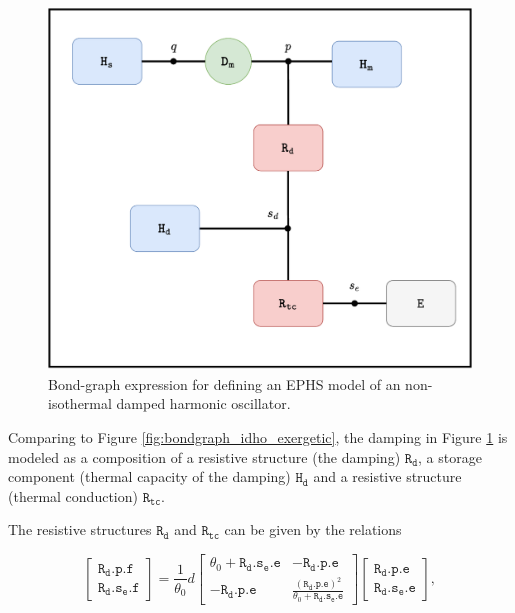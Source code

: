 \documentclass[
	parskip, 			   %
	twoside, 			   %
	DIV=14, 			   %
	BCOR=15.0mm, 		   %
	headsepline, 		   %
	open=right, 		   %
	captions=tableheading, %
	bibliography=totoc,    %
	numbers=noenddot       %
]{scrreprt}
\begin{document}
\begin{figure}[h!]
    \centering
    \includegraphics[scale=0.6]{figures/bondgraph_ndho_exergetic.pdf}
    \caption{Bond-graph expression for defining an EPHS model of an non-isothermal damped harmonic oscillator.}
    \label{fig:bondgraph_ndho_exergetic}
\end{figure}

Comparing to Figure \ref{fig:bondgraph_idho_exergetic}, the damping in Figure \ref{fig:bondgraph_ndho_exergetic} is modeled as a composition of a resistive structure (the damping) $\mathtt{R_d}$, a storage component (thermal capacity of the damping) $\mathtt{H_d}$ and a resistive structure (thermal conduction) $\mathtt{R_{tc}}$. 

The resistive structures $\mathtt{R_d}$ and $\mathtt{R_{tc}}$ can be given by the relations

\begin{equation}
    \label{eq:resistive_structure_damping_interconnection_ndho}
    \left[\begin{array}{l}\mathtt{R_{d}.p.f} \\ \mathtt{R_{d}.s_{e}.f}\end{array}\right]=\frac{1}{\theta_0} d\left[\begin{array}{rr}\theta_0+\mathtt{R_{d}.s_{e}.e} & -\mathtt{R_{d}.p.e} \\ -\mathtt{R_{d}.p.e} & \frac{(\mathtt{R_{d}.p.e})^2}{\theta_0+\mathtt{R_{d}.s_{e}.e}}\end{array}\right]\left[\begin{array}{l}\mathtt{R_{d}.p.e} \\ \mathtt{R_{d}.s_{e}.e}\end{array}\right],
\end{equation}
\end{document}
